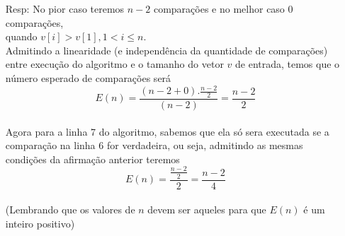 \documentclass{homework}
\begin{document}
\pagestyle{fancy}

	\begin{enumerate}
		\item[Resp:] No pior caso teremos $n-2$ comparações e no melhor caso $0$ comparações, \\
		quando $v[i] > v[1], 1 < i \leq n$.\\
		Admitindo a linearidade (e independência da quantidade de comparações) entre execução do algoritmo e o tamanho do vetor $v$ de entrada, temos que o número esperado de comparações será \[E(n) = \frac{(n-2+0).\frac{n-2}{2}}{(n-2)} = \frac{n-2}{2}\]\\
		Agora para a linha 7 do algoritmo, sabemos que ela só sera executada se a comparação na linha 6 for verdadeira, ou seja, admitindo as mesmas condições da afirmação anterior teremos \[E(n) = \frac{\frac{n-2}{2}}{2} = \frac{n-2}{4}\]\\
		(Lembrando que os valores de $n$ devem ser aqueles para que $E(n)$ é um inteiro positivo)
	\end{enumerate}
\end{document}
